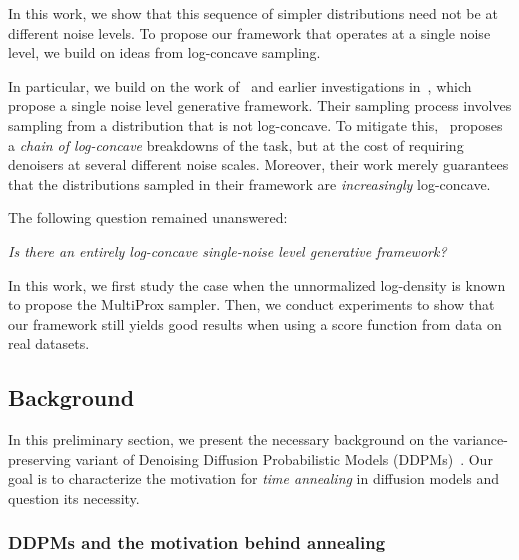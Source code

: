 In this work, we show that this sequence of simpler distributions need not be at different noise levels. To propose our framework that operates at a single noise level, we build on ideas from log-concave sampling.

In particular, we build on the work of~\cite{saremi_multimeasurement_2022} and earlier investigations in~\cite{jain_journey_2022}, which propose a single noise level generative framework. Their sampling process involves sampling from a distribution that is not log-concave. To mitigate this,~\cite{saremi_chain_2024} proposes a \emph{chain of log-concave} breakdowns of the task, but at the cost of requiring denoisers at several different noise scales. Moreover, their work merely guarantees that the distributions sampled in their framework are \emph{increasingly} log-concave. 

The following question remained unanswered:
\begin{center}
    \emph{Is there an entirely log-concave single-noise level generative framework?}
\end{center}

In this work, we first study the case when the unnormalized log-density is known to propose the MultiProx sampler. Then, we conduct experiments to show that our framework still yields good results when using a score function from data on real datasets. 

\subsection{Background}
\label{sec:background_multiprox}

In this preliminary section, we present the necessary background on the variance-preserving variant of Denoising Diffusion Probabilistic Models (DDPMs)~\cite{ho_denoising_2020}. Our goal is to characterize the motivation for \emph{time annealing} in diffusion models and question its necessity. 

\subsubsection{DDPMs and the motivation behind annealing}

